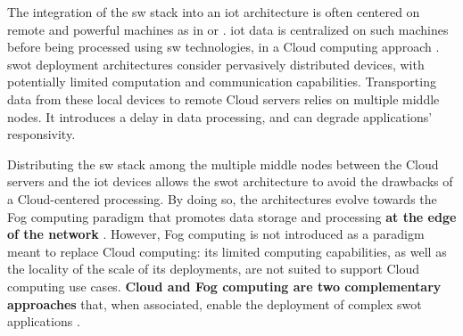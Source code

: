 \documentclass[sw]{iosart2x}
\begin{document}
The integration of the \gls{sw} stack into an \gls{iot} architecture is often centered on remote and powerful machines as in \cite{Gyrard2017} or \cite{Wang2018}. 
\gls{iot} data is centralized on such machines before being processed using \gls{sw} technologies, in a Cloud computing approach \cite{Mell2011}.
\gls{swot} deployment architectures consider pervasively distributed devices, with potentially limited computation and communication capabilities. 
Transporting data from these local devices to remote Cloud servers relies on multiple middle nodes.
It introduces a delay in data processing, and can degrade applications' responsivity.

Distributing the \gls{sw} stack among the multiple middle nodes between the Cloud servers and the \gls{iot} devices allows the \gls{swot} architecture to avoid the drawbacks of a Cloud-centered processing.
By doing so, the architectures evolve towards the Fog computing paradigm \cite{Bonomi2012} that promotes data storage and processing \textbf{at the edge of the network} \cite{Patel2017}.
However, Fog computing is not introduced as a paradigm meant to replace Cloud computing: its limited computing capabilities, as well as the locality of the scale of its deployments, are not suited to support Cloud computing use cases.
\textbf{Cloud and Fog computing are two complementary approaches} that, when associated, enable the deployment of complex \gls{swot} applications \cite{Sahni2017}.
\end{document}
